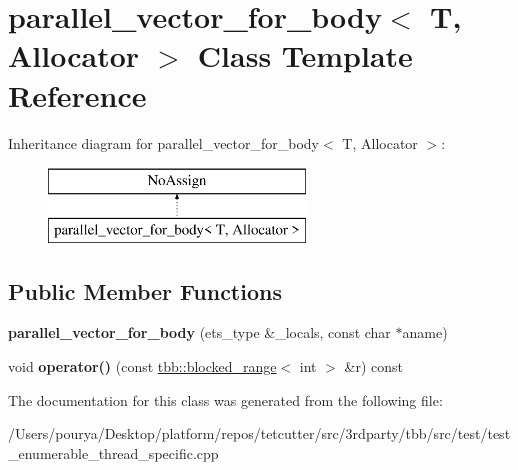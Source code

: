 \hypertarget{classparallel__vector__for__body}{}\section{parallel\+\_\+vector\+\_\+for\+\_\+body$<$ T, Allocator $>$ Class Template Reference}
\label{classparallel__vector__for__body}
Inheritance diagram for parallel\+\_\+vector\+\_\+for\+\_\+body$<$ T, Allocator $>$\+:\begin{figure}[H]
\begin{center}
\leavevmode
\includegraphics[height=2.000000cm]{classparallel__vector__for__body}
\end{center}
\end{figure}
\subsection*{Public Member Functions}
\begin{DoxyCompactItemize}
\item 
\hypertarget{classparallel__vector__for__body_add095e6a4f5be496435674f868736da2}{}{\bfseries parallel\+\_\+vector\+\_\+for\+\_\+body} (ets\+\_\+type \&\+\_\+locals, const char $\ast$aname)\label{classparallel__vector__for__body_add095e6a4f5be496435674f868736da2}

\item 
\hypertarget{classparallel__vector__for__body_a89d0ad1ed160434814a8793220abf928}{}void {\bfseries operator()} (const \hyperlink{classtbb_1_1blocked__range}{tbb\+::blocked\+\_\+range}$<$ int $>$ \&r) const \label{classparallel__vector__for__body_a89d0ad1ed160434814a8793220abf928}

\end{DoxyCompactItemize}


The documentation for this class was generated from the following file\+:\begin{DoxyCompactItemize}
\item 
/\+Users/pourya/\+Desktop/platform/repos/tetcutter/src/3rdparty/tbb/src/test/test\+\_\+enumerable\+\_\+thread\+\_\+specific.\+cpp\end{DoxyCompactItemize}
